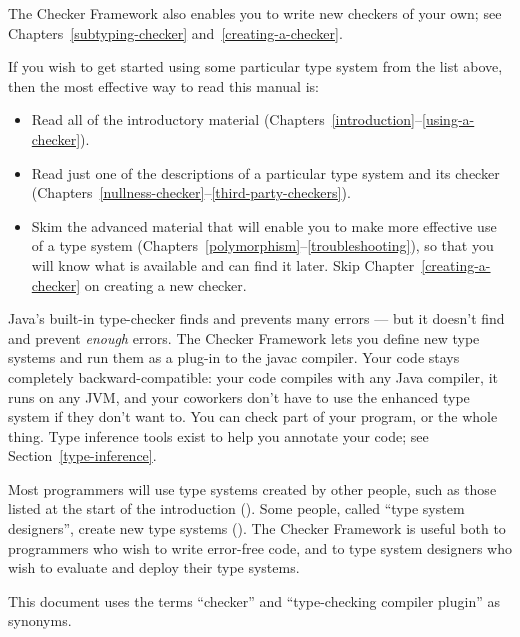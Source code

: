 The Checker Framework also enables you to write new checkers of your
own; see Chapters~\ref{subtyping-checker} and~\ref{creating-a-checker}.



If you wish to get started using some particular type system from the list
above, then the most effective way to read this manual is:

\begin{itemize}
\item
  Read all of the introductory material
  (Chapters~\ref{introduction}--\ref{using-a-checker}).
\item
  Read just one of the descriptions of a particular type system and its
  checker (Chapters~\ref{nullness-checker}--\ref{third-party-checkers}).
\item
  Skim the advanced material that will enable you to make more effective
  use of a type system
  (Chapters~\ref{polymorphism}--\ref{troubleshooting}), so that you will
  know what is available and can find it later.  Skip
  Chapter~\ref{creating-a-checker} on creating a new checker.
\end{itemize}



Java's built-in type-checker finds and prevents many errors --- but it
doesn't find and prevent \emph{enough} errors.  The Checker Framework lets you
define new type systems and run them as a plug-in to the javac compiler.  Your
code stays completely backward-compatible:  your code compiles with any
Java compiler, it runs on any JVM, and your coworkers don't have to use the
enhanced type system if they don't want to.  You can check part of
your program, or the whole thing.  Type inference tools exist to help you annotate your
code; see Section~\ref{type-inference}.

Most programmers will use type systems created by other people, such as
those listed at the start of the introduction ().
Some people, called ``type system designers'', create new type systems
().
The Checker Framework is useful both to programmers who
wish to write error-free code, and to type system designers who wish to
evaluate and deploy their type systems.

This document uses the terms ``checker'' and ``type-checking compiler
plugin'' as synonyms.

